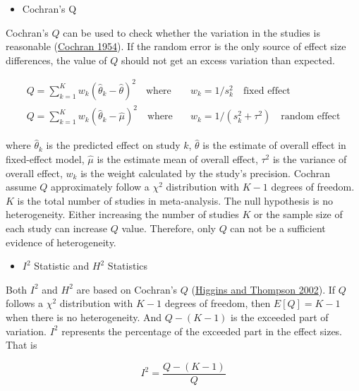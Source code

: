 \documentclass[
  11pt,
  openany]{memoir}
\providecommand{\tightlist}{%
  \setlength{\itemsep}{0pt}\setlength{\parskip}{0pt}}
\begin{document}
\begin{itemize}
\tightlist
\item
  Cochran's Q
\end{itemize}

Cochran's \(Q\) can be used to check whether the variation in the studies is reasonable (\protect\hyperlink{ref-cochranMethodsStrengtheningCommon1954}{Cochran 1954}).
If the random error is the only source of effect size differences, the value of \(Q\) should not get an excess variation than expected.

\begin{equation}
\begin{split}
Q = \sum^K_{k=1}w_k(\hat\theta_k-\hat\theta)^2\quad\text{where}&\quad w_k=1/s^2_k\quad\text{fixed effect}\\
Q = \sum_{k=1}^{K} w_k (\hat\theta_k-\hat\mu)^2\quad\text{where}&\quad w_k=1/(s^2_k+\tau^2)\quad\text{random effect}
\end{split}
\end{equation}

where \(\hat\theta_k\) is the predicted effect on study \(k\), \(\hat\theta\) is the estimate of overall effect in fixed-effect model, \(\hat\mu\) is the estimate mean of overall effect, \(\tau^2\) is the variance of overall effect, \(w_k\) is the weight calculated by the study's precision.
Cochran assume \(Q\) approximately follow a \(\chi^2\) distribution with \(K-1\) degrees of freedom.
\(K\) is the total number of studies in meta-analysis.
The null hypothesis is no heterogeneity.
Either increasing the number of studies \(K\) or the sample size of each study can increase \(Q\) value.
Therefore, only \(Q\) can not be a sufficient evidence of heterogeneity.

\begin{itemize}
\tightlist
\item
  \(I^2\) Statistic and \(H^2\) Statistics
\end{itemize}

Both \(I^2\) and \(H^2\) are based on Cochran's \(Q\) (\protect\hyperlink{ref-higginsQuantifyingHeterogeneityMetaanalysis2002}{Higgins and Thompson 2002}).
If \(Q\) follows a \(\chi^2\) distribution with \(K-1\) degrees of freedom, then \(E[Q]=K-1\) when there is no heterogeneity.
And \(Q-(K-1)\) is the exceeded part of variation.
\(I^2\) represents the percentage of the exceeded part in the effect sizes.
That is

\begin{equation}
I^2 = \frac{Q-(K-1)}{Q}
\end{equation}
\end{document}

